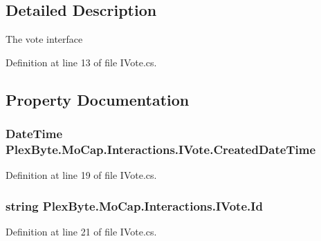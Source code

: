 \subsection{Detailed Description}
The vote interface 



Definition at line 13 of file I\+Vote.\+cs.



\subsection{Property Documentation}
\subsubsection[{\texorpdfstring{Created\+Date\+Time}{CreatedDateTime}}]{\setlength{\rightskip}{0pt plus 5cm}Date\+Time Plex\+Byte.\+Mo\+Cap.\+Interactions.\+I\+Vote.\+Created\+Date\+Time\hspace{0.3cm}{\ttfamily [get]}}\hypertarget{interface_plex_byte_1_1_mo_cap_1_1_interactions_1_1_i_vote_ad249938adad2c0889ca6568ddd9ee577}{}\label{interface_plex_byte_1_1_mo_cap_1_1_interactions_1_1_i_vote_ad249938adad2c0889ca6568ddd9ee577}


Definition at line 19 of file I\+Vote.\+cs.

\subsubsection[{\texorpdfstring{Id}{Id}}]{\setlength{\rightskip}{0pt plus 5cm}string Plex\+Byte.\+Mo\+Cap.\+Interactions.\+I\+Vote.\+Id\hspace{0.3cm}{\ttfamily [get]}}\hypertarget{interface_plex_byte_1_1_mo_cap_1_1_interactions_1_1_i_vote_a72cae3f576897cfb42b46c4206b0fe0f}{}\label{interface_plex_byte_1_1_mo_cap_1_1_interactions_1_1_i_vote_a72cae3f576897cfb42b46c4206b0fe0f}


Definition at line 21 of file I\+Vote.\+cs.

